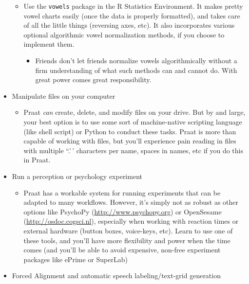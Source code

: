 \documentclass[11pt]{article}
\def\tightlist{}
\begin{document}
\begin{itemize}
  \begin{itemize}
  \tightlist
  \item
    Use the \texttt{vowels} package in the R Statistics Environment. It
    makes pretty vowel charts easily (once the data is properly
    formatted), and takes care of all the little things (reversing axes,
    etc). It also incorporates various optional algorithmic vowel
    normalization methods, if you choose to implement them.

    \begin{itemize}
    \tightlist
    \item
      Friends don't let friends normalize vowels algorithmically without
      a firm understanding of what such methods can and cannot do. With
      great power comes great responsibility.
    \end{itemize}
  \end{itemize}
\item
  Manipulate files on your computer

  \begin{itemize}
  \tightlist
  \item
    Praat \emph{can} create, delete, and modify files on your drive. But
    by and large, your best option is to use some sort of machine-native
    scripting language (like shell script) or Python to conduct these
    tasks. Praat is more than capable of working with files, but you'll
    experience pain reading in files with multiple ``.'\,' characters
    per name, spaces in names, etc if you do this in Praat.
  \end{itemize}
\item
  Run a perception or psychology experiment

  \begin{itemize}
  \tightlist
  \item
    Praat has a workable system for running experiments that can be
    adapted to many workflows. However, it's simply not as robust as
    other options like PsychoPy (\url{http://www.psychopy.org}) or
    OpenSesame (\url{http://osdoc.cogsci.nl}), especially when working
    with reaction times or external hardware (button boxes, voice-keys,
    etc). Learn to use one of these tools, and you'll have more
    flexibility and power when the time comes (and you'll be able to
    avoid expensive, non-free experiment packages like ePrime or
    SuperLab)
  \end{itemize}
\item
  Forced Alignment and automatic speech labeling/text-grid generation


\end{itemize}
\end{document}

